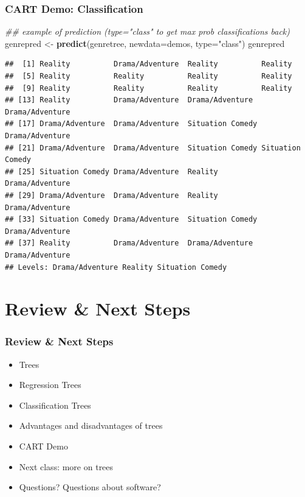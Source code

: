 \documentclass[
  shownotes,
  xcolor={svgnames},
  hyperref={colorlinks,citecolor=DarkBlue,linkcolor=DarkRed,urlcolor=DarkBlue}
  ]{beamer}
\newenvironment{Shaded}{\begin{snugshade}}{\end{snugshade}}
\newcommand{\CommentTok}[1]{\textcolor[rgb]{0.56,0.35,0.01}{\textit{#1}}}
\newcommand{\DataTypeTok}[1]{\textcolor[rgb]{0.13,0.29,0.53}{#1}}
\newcommand{\KeywordTok}[1]{\textcolor[rgb]{0.13,0.29,0.53}{\textbf{#1}}}
\newcommand{\NormalTok}[1]{#1}
\newcommand{\StringTok}[1]{\textcolor[rgb]{0.31,0.60,0.02}{#1}}
\begin{document}
\begin{frame}[fragile]
\frametitle{CART Demo: Classification}

\begin{scriptsize}
\begin{Shaded}
\begin{Highlighting}[]
\CommentTok{\#\# example of prediction (type="class"  to get max prob classifications back)}
\NormalTok{genrepred \textless{}{-}}\StringTok{ }\KeywordTok{predict}\NormalTok{(genretree, }\DataTypeTok{newdata=}\NormalTok{demos, }\DataTypeTok{type=}\StringTok{"class"}\NormalTok{)}
\NormalTok{genrepred}
\end{Highlighting}
\end{Shaded}
\end{scriptsize}

\begin{tiny}
\begin{verbatim}
##  [1] Reality          Drama/Adventure  Reality          Reality         
##  [5] Reality          Reality          Reality          Reality         
##  [9] Reality          Reality          Reality          Reality         
## [13] Reality          Drama/Adventure  Drama/Adventure  Drama/Adventure 
## [17] Drama/Adventure  Drama/Adventure  Situation Comedy Drama/Adventure 
## [21] Drama/Adventure  Drama/Adventure  Situation Comedy Situation Comedy
## [25] Situation Comedy Drama/Adventure  Reality          Drama/Adventure 
## [29] Drama/Adventure  Drama/Adventure  Reality          Drama/Adventure 
## [33] Situation Comedy Drama/Adventure  Situation Comedy Drama/Adventure 
## [37] Reality          Drama/Adventure  Drama/Adventure  Drama/Adventure 
## Levels: Drama/Adventure Reality Situation Comedy
\end{verbatim}
\end{tiny}



\end{frame}
\section{Review \& Next Steps}
\begin{frame}
\frametitle{Review \& Next Steps}

\begin{itemize} 
    \item Trees
    \item Regression Trees
    \item Classification Trees
    \item  Advantages and disadvantages of trees
    \item  CART Demo

    \bigskip  
  \item  Next class:  more on trees


\bigskip  
\item Questions? Questions about software? 

\end{itemize}
\end{frame}
\end{document}
